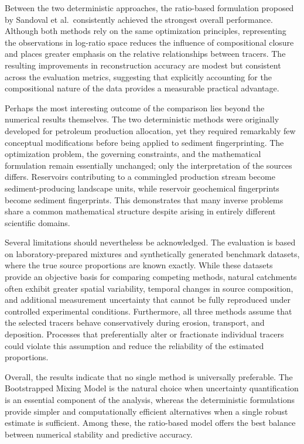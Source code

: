 \documentclass[
  12pt,
  letterpaper,
]{book}
\begin{document}
Between the two deterministic approaches, the ratio-based formulation
proposed by Sandoval et al.~consistently achieved the strongest overall
performance. Although both methods rely on the same optimization
principles, representing the observations in log-ratio space reduces the
influence of compositional closure and places greater emphasis on the
relative relationships between tracers. The resulting improvements in
reconstruction accuracy are modest but consistent across the evaluation
metrics, suggesting that explicitly accounting for the compositional
nature of the data provides a measurable practical advantage.

Perhaps the most interesting outcome of the comparison lies beyond the
numerical results themselves. The two deterministic methods were
originally developed for petroleum production allocation, yet they
required remarkably few conceptual modifications before being applied to
sediment fingerprinting. The optimization problem, the governing
constraints, and the mathematical formulation remain essentially
unchanged; only the interpretation of the sources differs. Reservoirs
contributing to a commingled production stream become sediment-producing
landscape units, while reservoir geochemical fingerprints become
sediment fingerprints. This demonstrates that many inverse problems
share a common mathematical structure despite arising in entirely
different scientific domains.

Several limitations should nevertheless be acknowledged. The evaluation
is based on laboratory-prepared mixtures and synthetically generated
benchmark datasets, where the true source proportions are known exactly.
While these datasets provide an objective basis for comparing competing
methods, natural catchments often exhibit greater spatial variability,
temporal changes in source composition, and additional measurement
uncertainty that cannot be fully reproduced under controlled
experimental conditions. Furthermore, all three methods assume that the
selected tracers behave conservatively during erosion, transport, and
deposition. Processes that preferentially alter or fractionate
individual tracers could violate this assumption and reduce the
reliability of the estimated proportions.

Overall, the results indicate that no single method is universally
preferable. The Bootstrapped Mixing Model is the natural choice when
uncertainty quantification is an essential component of the analysis,
whereas the deterministic formulations provide simpler and
computationally efficient alternatives when a single robust estimate is
sufficient. Among these, the ratio-based model offers the best balance
between numerical stability and predictive accuracy.
\end{document}
